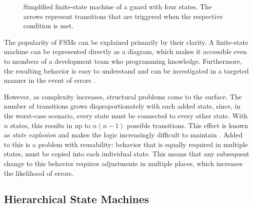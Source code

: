 \begin{figure}[!t]
\centering
{}
\caption{Simplified finite-state machine of a guard with four states. The arrows represent transitions that are triggered when the respective condition is met.}
\label{fig:fsm}
\end{figure}

The popularity of FSMs can be explained primarily by their clarity. A finite-state machine can be represented directly as a diagram, which makes it accessible even to members of a development team who programming knowledge. Furthermore, the resulting behavior is easy to understand and can be investigated in a targeted manner in the event of errors \cite{millington2009}.

However, as complexity increases, structural problems come to the surface. The number of transitions grows disproportionately with each added state, since, in the worst-case scenario, every state must be connected to every other state. With $n$ states, this results in up to $n(n-1)$ possible transitions. This effect is known as \emph{state explosion} and makes the logic increasingly difficult to maintain \cite{millington2009}. Added to this is a problem with reusability: behavior that is equally required in multiple states, must be copied into each individual state. This means that any subsequent change to this behavior requires adjustments in multiple places, which increases the likelihood of errors.

\subsection{Hierarchical State Machines}

